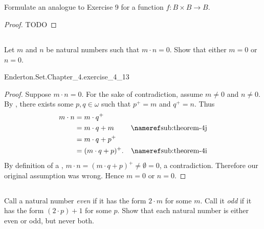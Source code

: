 \documentclass{report}
\begin{document}
\subsection{}%

  Formulate an analogue to Exercise 9 for a function
    $f \colon B \times B \rightarrow B$.

  \begin{proof}
    TODO
  \end{proof}

\subsection{}%

  Let $m$ and $n$ be natural numbers such that $m \cdot n = 0$.
  Show that either $m = 0$ or $n = 0$.

    {Enderton.Set.Chapter\_4.exercise\_4\_13}

  \begin{proof}
    Suppose $m \cdot n = 0$.
    For the sake of contradiction, assume $m \neq 0$ and $n \neq 0$.
    By , there exists some $p, q \in \omega$ such that
      $p^+ = m$ and $q^+ = n$.
    Thus
      \begin{align*}
        m \cdot n
          & = m \cdot q^+ \\
          & = m \cdot q + m & \textref{sub:theorem-4j} \\
          & = m \cdot q + p^+ \\
          & = (m \cdot q + p)^+. & \textref{sub:theorem-4i}
      \end{align*}
    By definition of a ,
      $m \cdot n = (m \cdot q + p)^+ \neq \emptyset = 0$, a contradiction.
    Therefore our original assumption was wrong.
    Hence $m = 0$ or $n = 0$.
  \end{proof}

\subsection{}%

  Call a natural number \textit{even} if it has the form $2 \cdot m$ for some
    $m$.
  Call it \textit{odd} if it has the form $(2 \cdot p) + 1$ for some $p$.
  Show that each natural number is either even or odd, but never both.
\end{document}
